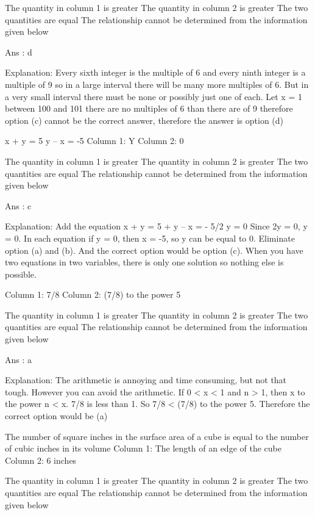         The quantity in column 1 is greater
        The quantity in column 2 is greater
        The two quantities are equal
        The relationship cannot be determined from the information given below 

    Ans : d

    Explanation:
    Every sixth integer is the multiple of 6 and every ninth integer is a multiple of 9 so in a large interval there will be many more multiples of 6. But in a very small interval there must be none or possibly just one of each. Let x = 1 between 100 and 101 there are no multiples of 6 than there are of 9 therefore option (c) cannot be the correct answer, therefore the answer is option (d)

    x + y = 5
    y – x = -5
    Column 1: Y
    Column 2: 0

        The quantity in column 1 is greater
        The quantity in column 2 is greater
        The two quantities are equal
        The relationship cannot be determined from the information given below 

    Ans : c

    Explanation:
    Add the equation x + y = 5 + y – x = - 5/2 y = 0
    Since 2y = 0, y = 0. In each equation if y = 0, then x = -5, so y can be equal to 0. Eliminate option (a) and (b). And the correct option would be option (c). When you have two equations in two variables, there is only one solution so nothing else is possible.

    Column 1: 7/8
    Column 2: (7/8) to the power 5

        The quantity in column 1 is greater
        The quantity in column 2 is greater
        The two quantities are equal
        The relationship cannot be determined from the information given below 

    Ans : a

    Explanation:
    The arithmetic is annoying and time consuming, but not that tough. However you can avoid the arithmetic. If 0 < x < 1 and n > 1, then x to the power n < x. 7/8 is less than 1. So 7/8 < (7/8) to the power 5. Therefore the correct option would be (a)

    The number of square inches in the surface area of a cube is equal to the number of cubic inches in its volume Column 1: The length of an edge of the cube
    Column 2: 6 inches

        The quantity in column 1 is greater
        The quantity in column 2 is greater
        The two quantities are equal
        The relationship cannot be determined from the information given below 

